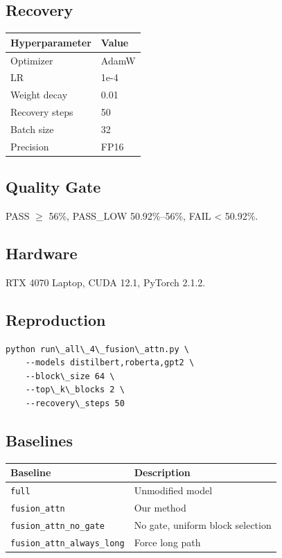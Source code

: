 \subsection{Recovery}

\begin{table}[H]
\centering
\small
\begin{tabular}{ll}
\toprule
\textbf{Hyperparameter} & \textbf{Value} \\
\midrule
Optimizer & AdamW \\
LR & 1e-4 \\
Weight decay & 0.01 \\
Recovery steps & 50 \\
Batch size & 32 \\
Precision & FP16 \\
\bottomrule
\end{tabular}
\end{table}

\subsection{Quality Gate}

PASS $\ge$ 56\%, PASS\_LOW 50.92\%--56\%, FAIL \textless{} 50.92\%.

\subsection{Hardware}

RTX 4070 Laptop, CUDA 12.1, PyTorch 2.1.2.

\subsection{Reproduction}

\begin{lstlisting}
python run\_all\_4\_fusion\_attn.py \
    --models distilbert,roberta,gpt2 \
    --block\_size 64 \
    --top\_k\_blocks 2 \
    --recovery\_steps 50
\end{lstlisting}

\subsection{Baselines}

\begin{table}[H]
\centering
\small
\begin{tabular}{ll}
\toprule
\textbf{Baseline} & \textbf{Description} \\
\midrule
\texttt{full} & Unmodified model \\
\texttt{fusion\_attn} & Our method \\
\texttt{fusion\_attn\_no\_gate} & No gate, uniform block selection \\
\texttt{fusion\_attn\_always\_long} & Force long path \\
\bottomrule
\end{tabular}
\end{table}



